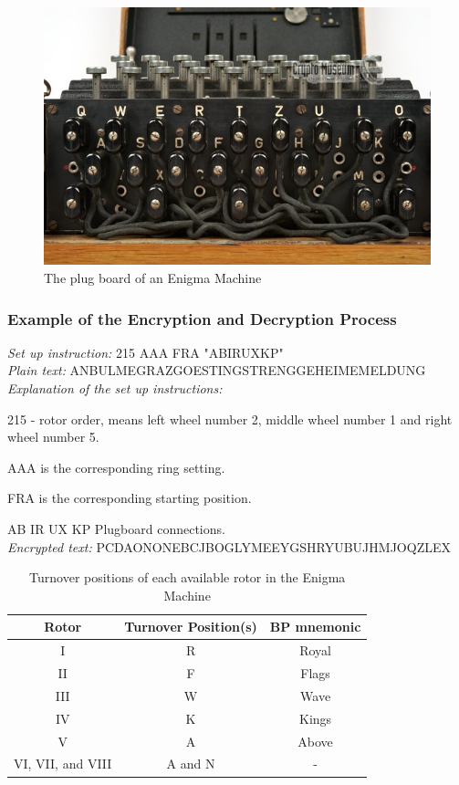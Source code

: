 \documentclass{article}
\begin{document}
\begin{figure}[h!]
\centering 
\includegraphics[scale=0.4]{plug board.jpeg}
\caption{The plug board of an Enigma Machine}
\label{fig:plug-board}
\end{figure}

\subsubsection{Example of the Encryption and Decryption Process} 
\textit{Set up instruction:} 215 AAA FRA "ABIRUXKP" \\
\textit{Plain text:} ANBULMEGRAZGOESTINGSTRENGGEHEIMEMELDUNG \\
\textit{Explanation of the set up instructions: }
\par 215 - rotor order, means left wheel number 2, middle wheel number 1 and right wheel number 5. 
\par AAA is the corresponding ring setting.
\par FRA is the corresponding starting position.
\par AB IR UX KP Plugboard connections. \\
\textit{Encrypted text:} PCDAONONEBCJBOGLYMEEYGSHRYUBUJHMJOQZLEX
    \begin{table}[hbt!]
    \caption{Turnover positions of each available rotor in the Enigma Machine}
    \centering 
    \begin{tabular}{c|c|c}
    \hline\hline 
    Rotor & Turnover Position(s) & BP mnemonic  \\
    \hline 
    I & R & Royal    \\
    II & F & Flags   \\
    III & W & Wave  \\
    IV & K & Kings \\
    V & A & Above  \\
    VI, VII, and VIII & A and N & - 
    \end{tabular}
    \end{table}
\end{document}
